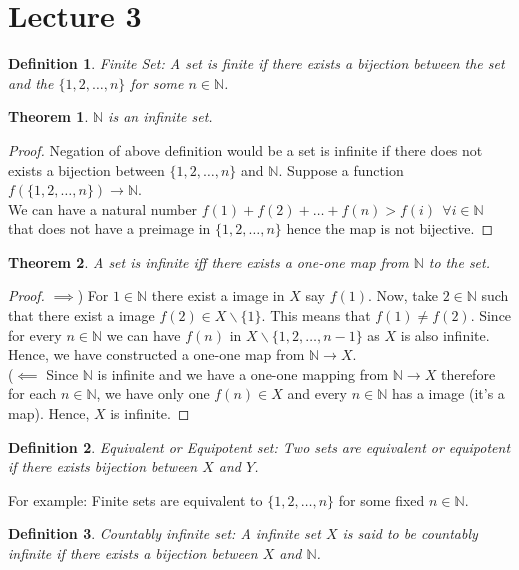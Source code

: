 \documentclass[12pt]{report}
\newtheorem{thm}{Theorem}
\newtheorem{defn}{Definition}
\begin{document}
\section*{Lecture 3}
\begin{defn}
    Finite Set: A set is finite if there exists a bijection between the set and the $\{1,2, \dots, n\}$ for some $n \in \mathbb{N}$.
\end{defn}
\begin{thm}
    $\mathbb{N}$ is an infinite set.
\end{thm}
\begin{proof}
    Negation of above definition would be a set is infinite if there does not exists a bijection between $\{1,2, \dots, n\}$ and $\mathbb{N}$. Suppose a function $f(\{1,2, \dots, n\}) \to \mathbb{N}$. \\
    We can have a natural number $f(1)+f(2)+\dots+f(n) > f(i)~~\forall i \in \mathbb{N}$ that does not have a preimage in $\{1,2, \dots, n\}$ hence the map is not bijective.
\end{proof}
\begin{thm}
    A set is infinite iff there exists a one-one map from $\mathbb{N}$ to the set.
\end{thm}
\begin{proof}
    $\implies$) For $1 \in \mathbb{N}$ there exist a image in $X$ say $f(1)$. Now, take $2 \in \mathbb{N}$ such that there exist a image $f(2) \in X\backslash \{1\}$. This means that $f(1) \neq f(2)$. Since for every $n \in \mathbb{N}$ we can have $f(n)$ in $X\backslash\{1,2, \dots, n-1\}$ as $X$ is also infinite. Hence, we have constructed a one-one map from $\mathbb{N} \to X$.\\
    ($\impliedby$ Since $\mathbb{N}$ is infinite and we have a one-one mapping from $\mathbb{N} \to X$ therefore for each $n \in \mathbb{N}$, we have only one $f(n) \in X$ and every $n \in \mathbb{N}$ has a image (it's a map). Hence, $X$ is infinite.
\end{proof}
\begin{defn}
    Equivalent or Equipotent set: Two sets are equivalent or equipotent if there exists bijection between $X$ and $Y$.
\end{defn}
For example: Finite sets are equivalent to $\{1,2, \dots, n\}$ for some fixed $n \in \mathbb{N}$.
\begin{defn}
    Countably infinite set: A infinite set $X$ is said to be countably infinite if there exists a bijection between $X$ and $\mathbb{N}$. 
\end{defn}
\end{document}
